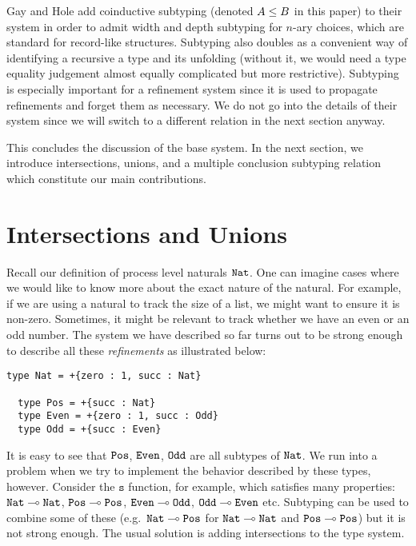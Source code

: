 \documentclass[a4paper,USenglish]{lipics-v2016}
\begin{document}
Gay and Hole \cite{GayH05} add coinductive subtyping (denoted $A \le B$ in this paper) to their system in order to admit width and depth subtyping for $n$-ary choices, which are standard for record-like structures. Subtyping also doubles as a convenient way of identifying a recursive a type and its unfolding (without it, we would need a type equality judgement almost equally complicated but more restrictive). Subtyping is especially important for a refinement system since it is used to propagate refinements and forget them as necessary. We do not go into the details of their system since we will switch to a different relation in the next section anyway.

This concludes the discussion of the base system. In the next section, we introduce intersections, unions, and a multiple conclusion subtyping relation which constitute our main contributions.


\section{Intersections and Unions}
\label{refinements}

Recall our definition of process level naturals $\mathtt{Nat}$. One can imagine cases where we would like to know more about the exact nature of the natural. For example, if we are using a natural to track the size of a list, we might want to ensure it is non-zero. Sometimes, it might be relevant to track whether we have an even or an odd number. The system we have described so far turns out to be strong enough to describe all these \emph{refinements} as illustrated below:
\begin{lstlisting}[language=krill, style=custom]
  type Nat = +{zero : 1, succ : Nat}

  type Pos = +{succ : Nat}
  type Even = +{zero : 1, succ : Odd}
  type Odd = +{succ : Even}
\end{lstlisting}

It is easy to see that $\mathtt{Pos}$, $\mathtt{Even}$, $\mathtt{Odd}$ are all subtypes of $\mathtt{Nat}$. We run into a problem when we try to implement the behavior described by these types, however. Consider the $\mathtt{s}$ function, for example, which satisfies many properties: $\mathtt{Nat} \multimap \mathtt{Nat}$, $\mathtt{Pos} \multimap \mathtt{Pos}$, $\mathtt{Even} \multimap \mathtt{Odd}$, $\mathtt{Odd} \multimap \mathtt{Even}$ etc. Subtyping can be used to combine some of these (e.g.\ $\mathtt{Nat} \multimap \mathtt{Pos}$ for $\mathtt{Nat} \multimap \mathtt{Nat}$ and $\mathtt{Pos} \multimap \mathtt{Pos}$) but it is not strong enough. The usual solution is adding intersections to the type system.
\end{document}
